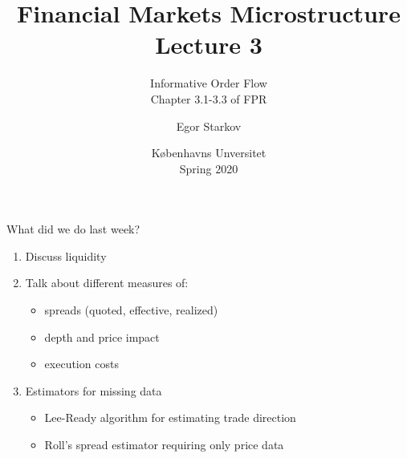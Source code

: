 \documentclass[english,10pt
,aspectratio=169
]{beamer}
\title{Financial Markets Microstructure \\ Lecture 3}
\subtitle{Informative Order Flow\\
	Chapter 3.1-3.3 of FPR}
\author{Egor Starkov}
\date{K{\o}benhavns Unversitet \\
	Spring 2020}
\begin{document}
	\frame[plain]{\titlepage}


\begin{frame}{What did we do last week?}
\begin{enumerate}
	\item Discuss liquidity
	\item Talk about different measures of:
	\begin{itemize}
		\item spreads (quoted, effective, realized)
		\item depth and price impact
		\item execution costs
	\end{itemize}
	\item Estimators for missing data
	\begin{itemize}
		\item Lee-Ready algorithm for estimating trade direction
		\item Roll's spread estimator requiring only price data
	\end{itemize}
\end{enumerate}
\end{frame}


\end{document}

